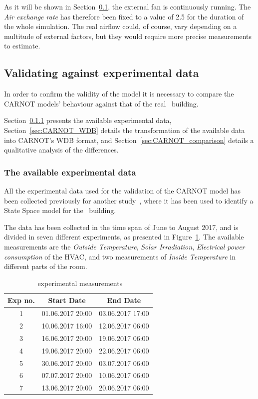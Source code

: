 As it will be shown in Section~\ref{sec:CARNOT_experimental}, the external fan
is continuously running. The \textit{Air exchange rate} has therefore been fixed
to a value of 2.5 for the duration of the whole simulation. The real airflow
could, of course, vary depending on a multitude of external factors, but they
would require more precise measurements to estimate.

\subsection{Validating against experimental data}\label{sec:CARNOT_experimental}

In order to confirm the validity of the model it is necessary to compare the
CARNOT models' behaviour against that of the real \pdome\ building.

Section~\ref{sec:CARNOT_expdata} presents the available experimental data,
Section~\ref{sec:CARNOT_WDB} details the transformation of the available data
into CARNOT's WDB format, and Section~\ref{sec:CARNOT_comparison} details a
qualitative analysis of the differences.

\subsubsection{The available experimental data}\label{sec:CARNOT_expdata}

All the experimental data used for the validation of the CARNOT model has been
collected previously for another
study~\cite{fabiettiMultitimeScaleCoordination2018}, where it has been used to
identify a State Space model for the \pdome\ building.

The data has been collected in the time span of June to August 2017, and is
divided in seven different experiments, as presented in
Figure~\ref{tab:exp_dates}. The available measurements are the \textit{Outside
Temperature}, \textit{Solar Irradiation}, \textit{Electrical power consumption}
of the HVAC, and two measurements of \textit{Inside Temperature} in different
parts of the room.

\begin{table}[ht]
\centering
    \begin{tabular}{||c c c||}
        \hline
        Exp no. & Start Date & End Date\\
        \hline \hline
        1 & 01.06.2017 20:00 & 03.06.2017 17:00 \\
        2 & 10.06.2017 16:00 & 12.06.2017 06:00 \\
        3 & 16.06.2017 20:00 & 19.06.2017 06:00 \\
        4 & 19.06.2017 20:00 & 22.06.2017 06:00 \\
        5 & 30.06.2017 20:00 & 03.07.2017 06:00 \\
        6 & 07.07.2017 20:00 & 10.06.2017 06:00 \\
        7 & 13.06.2017 20:00 & 20.06.2017 06:00 \\
        \hline
    \end{tabular}
\caption{\pdome\ experimental measurements}
\label{tab:exp_dates}
\end{table}


